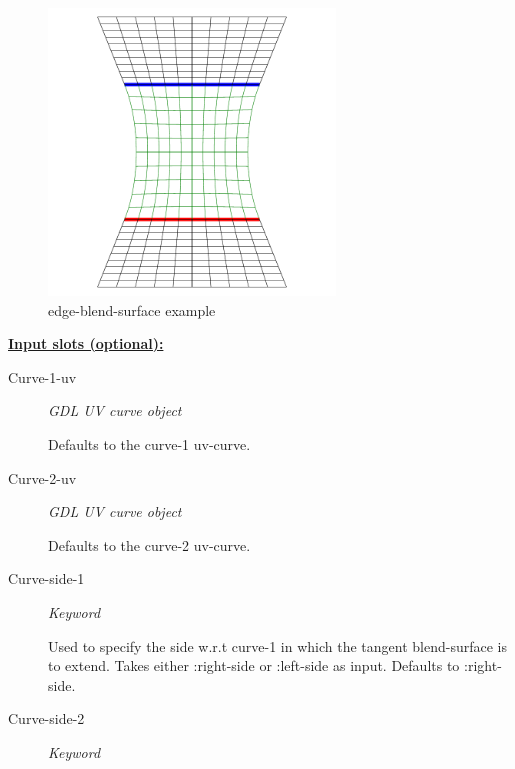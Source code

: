 \documentclass [11pt]{book}
\begin{document}
\begin{itemize}
\begin{figure}
\begin{center}
\includegraphics[width=3in,height=3in]{../images/example-edge-blend-surface.pdf}
\end{center}

\caption{edge-blend-surface example}

\label{fig:edge-blend-surface}

\end{figure}





\textbf{
\underline{Input slots (optional):}}

\begin{description}

\item [Curve-1-uv]
\emph{GDL UV curve object}

 Defaults to the curve-1 uv-curve.




\item [Curve-2-uv]
\emph{GDL UV curve object}

 Defaults to the curve-2 uv-curve.




\item [Curve-side-1]
\emph{Keyword}

 Used to specify the side w.r.t curve-1 in which the tangent blend-surface is to extend. Takes either :right-side or :left-side as input. Defaults to :right-side.




\item [Curve-side-2]
\emph{Keyword}


\end{description}
\end{itemize}
\end{document}
